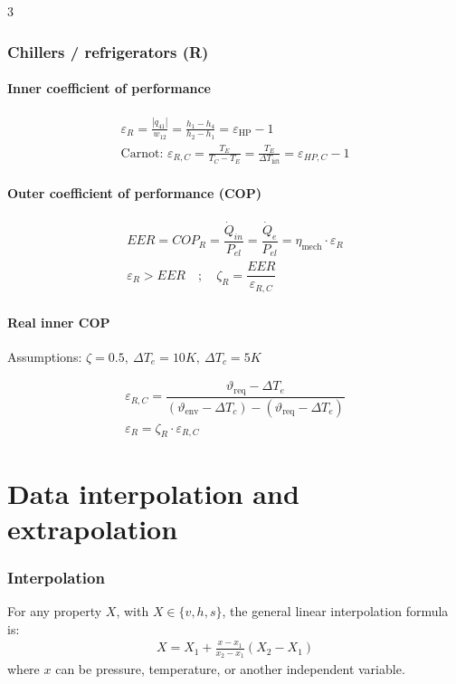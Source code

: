 \documentclass[9pt, landscape, a4paper]{article}
\begin{document}
\begin{multicols*}{3}
\section{Chillers / refrigerators (R)}
\subsection{Inner coefficient of performance}
\begin{gather*}
  \varepsilon_R = \frac{\left|q_{41}\right|}{w_{12}} = \frac{h_1-h_4}{h_2-h_1} = \varepsilon_\text{HP} - 1\\[1ex]
  \text{Carnot: } \varepsilon_{R,C} = \frac{T_E}{T_C - T_E} = \frac{T_E}{\Delta T_\text{lift}} = \varepsilon_{HP,C} - 1
\end{gather*}

\subsection{Outer coefficient of performance (COP)}
\begin{gather*}
  EER = COP_R = \dfrac{\dot{Q}_{in}}{P_{el}} = \dfrac{\dot{Q}_e}{P_{el}} = \eta_\text{mech}\cdot \varepsilon_R\\[1ex]
  \varepsilon_R > EER \quad ; \quad \zeta_R = \dfrac{EER}{\varepsilon_{R,C}}
\end{gather*}

\subsection{Real inner COP}
Assumptions: $\zeta = 0.5,\ \Delta T_e = 10K,\ \Delta T_c = 5K$

\begin{gather*}
  \varepsilon_{R,C} = \dfrac{\vartheta_\text{req} - \Delta T_e}{\left(\vartheta_\text{env} - \Delta T_c\right) - \left(\vartheta_\text{req} - \Delta T_e\right)}\\[1ex]
  \varepsilon_R = \zeta_R\cdot \varepsilon_{R,C}
\end{gather*}

\newpage
\vspace*{-.6cm}
\part{Data interpolation and extrapolation}
\section{Interpolation}
For any property $X$, with $X \in \{v,h,s\}$, the general linear interpolation
formula is:
\begin{gather*}
  X = X_1 + \frac{x-x_1}{x_2-x_1}\left(X_2-X_1\right)
\end{gather*}
where $x$ can be pressure, temperature, or another independent variable.


\end{multicols*}
\end{document}
